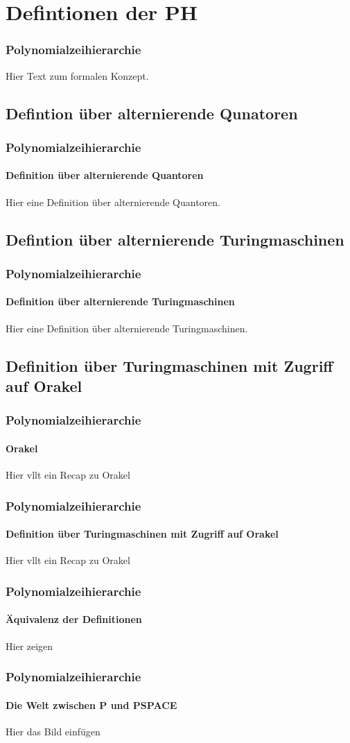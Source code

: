 \section{Defintionen der PH}
\begin{frame}
    \frametitle{Polynomialzeihierarchie}
    Hier Text zum formalen Konzept.
\end{frame}

\subsection{Defintion über alternierende Qunatoren}
\begin{frame}
    \frametitle{Polynomialzeihierarchie}
    \framesubtitle{Definition über alternierende Quantoren}
    Hier eine Definition über alternierende Quantoren.
\end{frame}

\subsection{Defintion über alternierende Turingmaschinen}
\begin{frame}
    \frametitle{Polynomialzeihierarchie}
    \framesubtitle{Definition über alternierende Turingmaschinen}
    Hier eine Definition über alternierende Turingmaschinen.
\end{frame}

\subsection{Definition über Turingmaschinen mit Zugriff auf Orakel}
\begin{frame}
    \frametitle{Polynomialzeihierarchie}
    \framesubtitle{Orakel}
    Hier vllt ein Recap zu Orakel
\end{frame}

\begin{frame}
    \frametitle{Polynomialzeihierarchie}
    \framesubtitle{Definition über Turingmaschinen mit Zugriff auf Orakel}
    Hier vllt ein Recap zu Orakel
\end{frame}



\begin{frame}
    \frametitle{Polynomialzeihierarchie}
    \framesubtitle{Äquivalenz der Definitionen}
    Hier zeigen
\end{frame}

\begin{frame}
    \frametitle{Polynomialzeihierarchie}
    \framesubtitle{Die Welt zwischen P und PSPACE}
    Hier das Bild einfügen
\end{frame}
